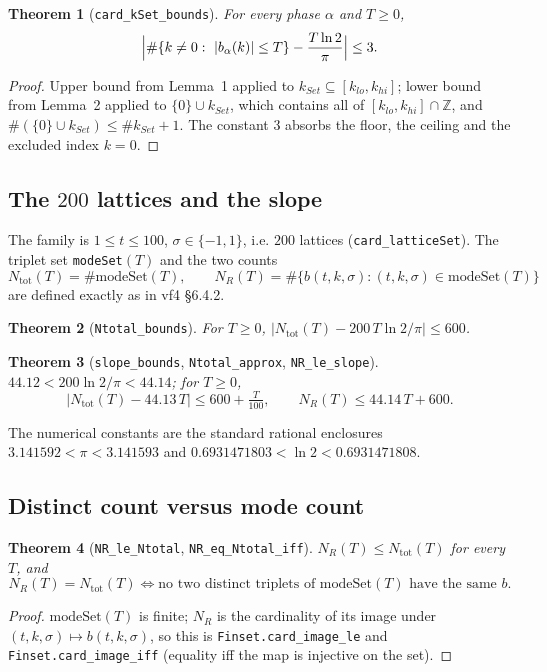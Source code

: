 \documentclass[11pt,a4paper]{article}
\newcommand{\Z}{\mathbb{Z}}
\newcommand{\lb}{\_\allowbreak}
\newcommand{\code}[1]{\texttt{#1}}
\newtheorem{theorem}{Theorem}[section]
\theoremstyle{definition}
\theoremstyle{remark}
\begin{document}
\begin{theorem}[\code{card\lb kSet\lb bounds}]\label{thm:kSet}
For every phase $\alpha$ and $T\ge0$,
\[
  \Bigl|\#\{k\neq0:\ |b_\alpha(k)|\le T\}-\frac{T\ln2}{\pi}\Bigr|\le3 .
\]
\end{theorem}
\begin{proof}
Upper bound from Lemma~1 applied to $k_{Set}\subseteq[k_{lo},k_{hi}]$; lower bound from
Lemma~2 applied to $\{0\}\cup k_{Set}$, which contains all of $[k_{lo},k_{hi}]\cap\Z$, and
$\#(\{0\}\cup k_{Set})\le\#k_{Set}+1$.  The constant $3$ absorbs the floor, the ceiling and
the excluded index $k=0$.
\end{proof}

\subsection{The $200$ lattices and the slope}

The family is $1\le t\le100$, $\sigma\in\{-1,1\}$, i.e. $200$ lattices
(\code{card\lb latticeSet}).  The triplet set \code{modeSet}$(T)$ and the two counts
\[
  N_{\mathrm{tot}}(T)=\#\mathrm{modeSet}(T),\qquad
  N_R(T)=\#\{b(t,k,\sigma):(t,k,\sigma)\in \mathrm{modeSet}(T)\}
\]
are defined exactly as in vf4 \S6.4.2.

\begin{theorem}[\code{Ntotal\lb bounds}]
For $T\ge0$, $\bigl|N_{\mathrm{tot}}(T)-200\,T\ln2/\pi\bigr|\le600$.
\end{theorem}
\begin{theorem}[\code{slope\lb bounds}, \code{Ntotal\lb approx}, \code{NR\lb le\lb slope}]
$44.12<200\ln2/\pi<44.14$; for $T\ge0$,
\[
  \bigl|N_{\mathrm{tot}}(T)-44.13\,T\bigr|\le600+\tfrac{T}{100},
  \qquad
  N_R(T)\le44.14\,T+600 .
\]
\end{theorem}

The numerical constants are the standard rational enclosures
$3.141592<\pi<3.141593$ and $0.6931471803<\ln2<0.6931471808$.

\subsection{Distinct count versus mode count}

\begin{theorem}[\code{NR\lb le\lb Ntotal}, \code{NR\lb eq\lb Ntotal\lb iff}]
$N_R(T)\le N_{\mathrm{tot}}(T)$ for every $T$, and
\[
  N_R(T)=N_{\mathrm{tot}}(T)\iff \text{no two distinct triplets of } \mathrm{modeSet}(T)
  \text{ have the same } b .
\]
\end{theorem}
\begin{proof}
$\mathrm{modeSet}(T)$ is finite; $N_R$ is the cardinality of its image under
$(t,k,\sigma)\mapsto b(t,k,\sigma)$, so this is \code{Finset.card\lb image\lb le} and
\code{Finset.card\lb image\lb iff} (equality iff the map is injective on the set).
\end{proof}
\end{document}
